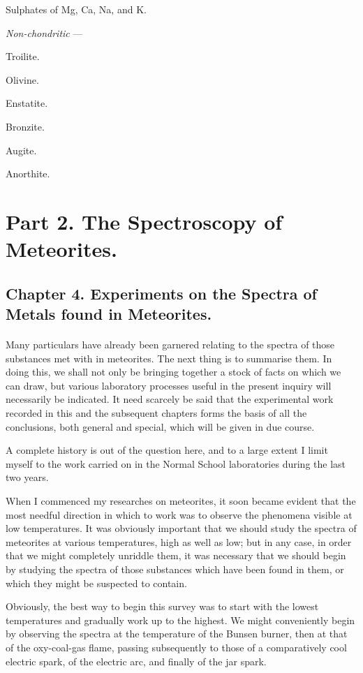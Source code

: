 \documentclass[a4paper, 12pt, oneside, polutonikogreek, english]{article}
\begin{document}
Sulphates of Mg, Ca, Na, and K.

\vspace{5mm}

\emph{Non-chondritic} ---

\vspace{2mm}

Troilite.

Olivine.

Enstatite.

Bronzite.

Augite.

Anorthite.
\clearpage
\section{Part 2. The Spectroscopy of Meteorites.}
\subsection{Chapter 4. Experiments on the Spectra of Metals found in Meteorites.}
\paragraph{}
Many particulars have already been garnered relating to the spectra of those substances met with in meteorites. The next thing is to summarise them. In doing this, we shall not only be bringing together a stock of facts on which we can draw, but various laboratory processes useful in the present inquiry will necessarily be indicated. It need scarcely be said that the experimental work recorded in this and the subsequent chapters forms the basis of all the conclusions, both general and special, which will be given in due course.

A complete history is out of the question here, and to a large extent I limit myself to the work carried on in the Normal School laboratories during the last two years.

When I commenced my researches on meteorites, it soon became evident that the most needful direction in which to work was to observe the phenomena visible at low temperatures. It was obviously important that we should study the spectra of meteorites at various temperatures, high as well as low; but in any case, in order that we might completely unriddle them, it was necessary that we should begin by studying the spectra of those substances which have been found in them, or which they might be suspected to contain.

Obviously, the best way to begin this survey was to start with the lowest temperatures and gradually work up to the highest. We might conveniently begin by observing the spectra at the temperature of the Bunsen burner, then at that of the oxy-coal-gas flame, passing subsequently to those of a comparatively cool electric spark, of the electric arc, and finally of the jar spark.
\end{document}
